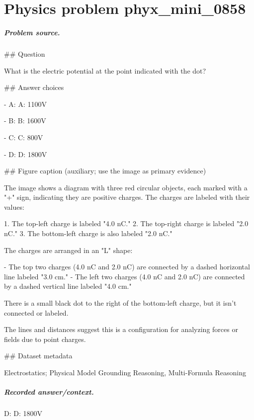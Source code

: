 
\chapter{Physics problem phyx\_mini\_0858}
\label{ch:PhyXMiniProblems_problem_phyx_mini_0858}

\paragraph{Problem source.}
\#\# Question

What is the electric potential at the point indicated with the dot?

\#\# Answer choices

- A: A: 1100V

- B: B: 1600V

- C: C: 800V

- D: D: 1800V

\#\# Figure caption (auxiliary; use the image as primary evidence)

The image shows a diagram with three red circular objects, each marked with a "+" sign, indicating they are positive charges. The charges are labeled with their values:

1. The top-left charge is labeled "4.0 nC."
2. The top-right charge is labeled "2.0 nC."
3. The bottom-left charge is also labeled "2.0 nC."

The charges are arranged in an "L" shape:

- The top two charges (4.0 nC and 2.0 nC) are connected by a dashed horizontal line labeled "3.0 cm."
- The left two charges (4.0 nC and 2.0 nC) are connected by a dashed vertical line labeled "4.0 cm."

There is a small black dot to the right of the bottom-left charge, but it isn't connected or labeled. 

The lines and distances suggest this is a configuration for analyzing forces or fields due to point charges.

\#\# Dataset metadata

Electrostatics; Physical Model Grounding Reasoning, Multi-Formula Reasoning

\paragraph{Recorded answer/context.}
D: D: 1800V

